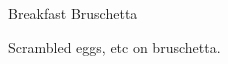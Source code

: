 
\begin{recipe}{Breakfast Bruschetta}
  \maketitle

  Scrambled eggs, etc on bruschetta.
\end{recipe}

